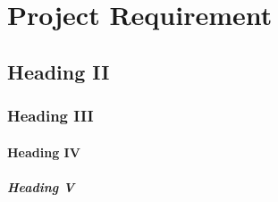 \section{Project Requirement}
\subsection{Heading II}
\subsubsection{Heading III}
\paragraph{Heading IV}
\subparagraph{Heading V}
